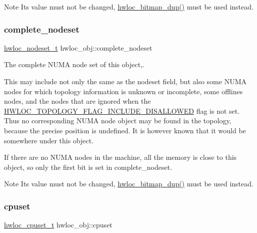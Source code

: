\begin{DoxyNote}{Note}
Its value must not be changed, \hyperlink{a00205_gae679434c1a5f41d3560a8a7e2c1b0dee}{hwloc\+\_\+bitmap\+\_\+dup()} must be used instead. 
\end{DoxyNote}
\mbox{\label{a00238_ac38c4012127525ef74c5615c526f4c2e}} 
\subsubsection{\texorpdfstring{complete\+\_\+nodeset}{complete\_nodeset}}
{\footnotesize\ttfamily \hyperlink{a00183_ga37e35730fa7e775b5bb0afe893d6d508}{hwloc\+\_\+nodeset\+\_\+t} hwloc\+\_\+obj\+::complete\+\_\+nodeset}



The complete N\+U\+MA node set of this object,. 

This may include not only the same as the nodeset field, but also some N\+U\+MA nodes for which topology information is unknown or incomplete, some offlines nodes, and the nodes that are ignored when the \hyperlink{a00193_ggada025d3ec20b4b420f8038d23d6e7bdea10907044bbb306fd0dc76acf046d9258}{H\+W\+L\+O\+C\+\_\+\+T\+O\+P\+O\+L\+O\+G\+Y\+\_\+\+F\+L\+A\+G\+\_\+\+I\+N\+C\+L\+U\+D\+E\+\_\+\+D\+I\+S\+A\+L\+L\+O\+W\+ED} flag is not set. Thus no corresponding N\+U\+MA node object may be found in the topology, because the precise position is undefined. It is however known that it would be somewhere under this object.

If there are no N\+U\+MA nodes in the machine, all the memory is close to this object, so only the first bit is set in {\ttfamily complete\+\_\+nodeset}.

\begin{DoxyNote}{Note}
Its value must not be changed, \hyperlink{a00205_gae679434c1a5f41d3560a8a7e2c1b0dee}{hwloc\+\_\+bitmap\+\_\+dup()} must be used instead. 
\end{DoxyNote}
\mbox{\label{a00238_a67925e0f2c47f50408fbdb9bddd0790f}} 
\subsubsection{\texorpdfstring{cpuset}{cpuset}}
{\footnotesize\ttfamily \hyperlink{a00183_ga4bbf39b68b6f568fb92739e7c0ea7801}{hwloc\+\_\+cpuset\+\_\+t} hwloc\+\_\+obj\+::cpuset}



